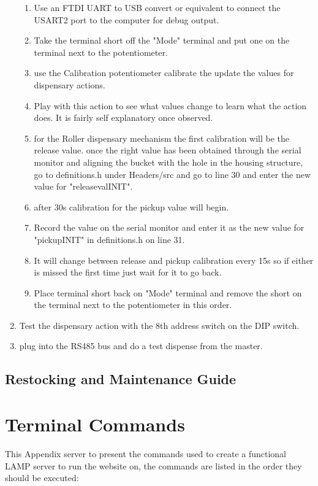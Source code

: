 \documentclass[a4paper,11pt]{article}
\numberwithin{figure}{section}
\numberwithin{table}{section}
\begin{document}
\begin{appendices}
\begin{enumerate}
{\begin{enumerate}
  \item Use an FTDI UART to USB convert or equivalent to connect the USART2 port to the computer for debug output.
  \item Take the terminal short off the "Mode" terminal and put one on the terminal next to the potentiometer.
  \item use the Calibration potentiometer calibrate the update the values for dispensary actions. 
  \item Play with this action to see what values change to learn what the action does. It is fairly self explanatory once observed.
  \item for the Roller dispensary mechanism the first calibration will be the release value. once the right value has been obtained through the serial monitor and aligning the bucket with the hole in the housing structure, go to definitions.h under Headers/src and go to line 30 and enter the new value for "releasevalINIT".
  \item after 30s calibration for the pickup value will begin.
  \item Record the value on the serial monitor and enter it as the new value for "pickupINIT" in definitions.h on line 31.
  \item It will change between release and pickup calibration every 15s so if either is missed the first time just wait for it to go back.
  \item Place terminal short back on "Mode" terminal and remove the short on the terminal next to the potentiometer in this order.
  \end{enumerate}}
  \item Test the dispensary action with the 8th address switch on the DIP switch.
  \item plug into the RS485 bus and do a test dispense from the master.
\end{enumerate}

\subsection{Restocking and Maintenance Guide}
\label{subsec:maintenace}

\newpage

\section{Terminal Commands}
\label{sec:PiCommands}

This Appendix server to present the commands used to create a functional LAMP server to run the website on, the commands are listed in the order they should be executed:


\end{appendices}
\end{document}

